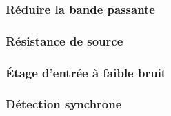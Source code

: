 \subsubsection{Réduire la bande passante} \label{subsubsec:bandepass}

\subsubsection{Résistance de source} \label{subsubsec:résistsource}

\subsubsection{Étage d'entrée à faible bruit} \label{subsubsec:entreenobruit}

\subsubsection{Détection synchrone} \label{subsubsec:detectsync}

